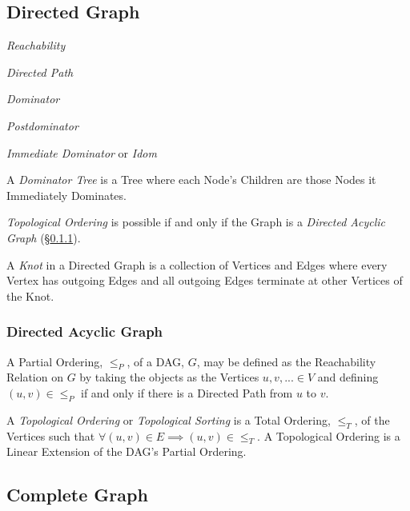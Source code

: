 \documentclass{article}
\begin{document}
\subsection{Directed Graph} \label{subsec:directed_graph}

\emph{Reachability}

\emph{Directed Path}

\emph{Dominator}

\emph{Postdominator}

\emph{Immediate Dominator} or \emph{Idom}

A \emph{Dominator Tree} is a Tree where each Node's Children are those
Nodes it Immediately Dominates.

\emph{Topological Ordering} is possible if and only if the Graph is a
\emph{Directed Acyclic Graph} (\S\ref{subsec:dag}).

A \emph{Knot} in a Directed Graph is a collection of Vertices and
Edges where every Vertex has outgoing Edges and all outgoing Edges
terminate at other Vertices of the Knot.



\subsubsection{Directed Acyclic Graph} \label{subsec:dag}

A Partial Ordering, $\leq_P$, of a DAG, $G$, may be defined as the
Reachability Relation on $G$ by taking the objects as the Vertices
$u,v,... \in V$ and defining $(u,v) \in \leq_P$ if and only if there
is a Directed Path from $u$ to $v$.

A \emph{Topological Ordering} or \emph{Topological Sorting} is a Total
Ordering, $\leq_T$, of the Vertices such that $\forall (u,v) \in E
\implies (u,v) \in \leq_T$. A Topological Ordering is a Linear
Extension of the DAG's Partial Ordering. %



\subsection{Complete Graph} \label{subsec:complete_graph}
\end{document}
